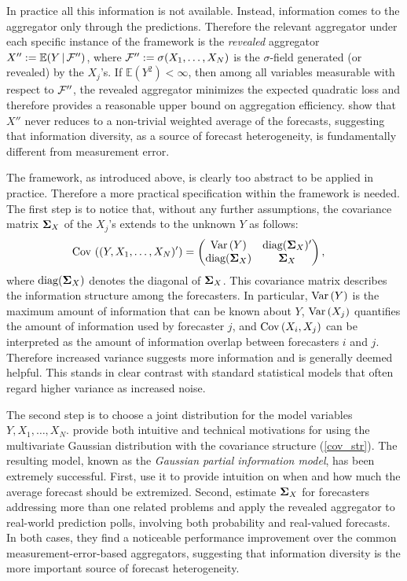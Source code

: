 \documentclass[10pt,twoside]{article}
\newcommand{\E}{\mathbb{E}}
\theoremstyle{definition}
\theoremstyle{definition}
\def\bSigma{{\bf \Sigma}}
\def\F{{\cal F}}
\def\E{{\mathbb E}}
\def\Var{{\rm Var}\,}
\def\Cov{{\rm Cov}\,}
\def\|{\, | \,}
\def\diag{\text{diag}}
\def\diag{\text{diag}}
\begin{document}
In practice all this information is not available. Instead, information comes to the aggregator only through the predictions. Therefore the relevant aggregator under each specific instance of the framework is the \textit{revealed} aggregator $X'' := \E (Y \|
\F'')$, where $\F'' := \sigma(X_1, \dots, X_N)$ is the $\sigma$-field generated (or revealed) by the
$X_j$'s.  If $\E(Y^2) < \infty$, then among all variables measurable with respect to $\F''$, the revealed aggregator minimizes the expected quadratic loss and therefore provides a reasonable upper bound on aggregation efficiency. \cite{satopaa2015combining} show that $X''$ never reduces to a non-trivial weighted average of the forecasts, suggesting that information diversity, as a source of forecast heterogeneity, is fundamentally different from measurement error. 


The framework, as introduced above, is clearly too abstract to be applied in practice. Therefore a more practical specification within the framework is needed. The first step is to notice that, without any further assumptions, the covariance matrix $\bSigma_X$ of the $X_j$'s extends to the unknown $Y$ as follows:
\begin{align}
\Cov\left((Y, X_1, \dots, X_N)'\right) &=  \left( \begin{matrix} 
 \Var(Y)  & \diag(\bSigma_X)'  \\
\diag(\bSigma_X) & \bSigma_X \\
\end{matrix} \right), \label{cov_str}
\end{align}
where $\diag(\bSigma_X)$ denotes the diagonal of $\bSigma_X$. This covariance matrix describes the information structure among the forecasters. In particular, $\Var(Y)$ is the maximum amount of information that can be known about $Y$, $\Var(X_j)$ quantifies the amount of information used by forecaster $j$, and 
 $\Cov (X_{i} , X_{j})$ can be interpreted as the amount of information overlap between forecasters $i$ and $j$.  Therefore increased variance suggests more information and is generally deemed helpful. This stands in clear contrast with standard statistical models that often regard higher variance as increased noise. 
 
 The second step is to choose a joint distribution for the model variables $Y, X_1, \dots, X_N$.
  \cite{satopaa2015partial} provide both intuitive and technical motivations for using the multivariate Gaussian distribution with the covariance structure (\ref{cov_str}). The resulting model, known as the \textit{Gaussian partial information model}, has been extremely successful. First, \cite{satopaamodeling} use it to provide intuition on when and how much the average forecast should be extremized. Second, \cite{satopaa2015partial} estimate $\bSigma_X$ for forecasters addressing more than one related problems and apply the revealed aggregator to real-world prediction polls, involving both probability and real-valued forecasts. In both cases, they find a noticeable performance improvement over the common measurement-error-based aggregators, suggesting that  information diversity is the more important  source of forecast heterogeneity. 
\end{document}

